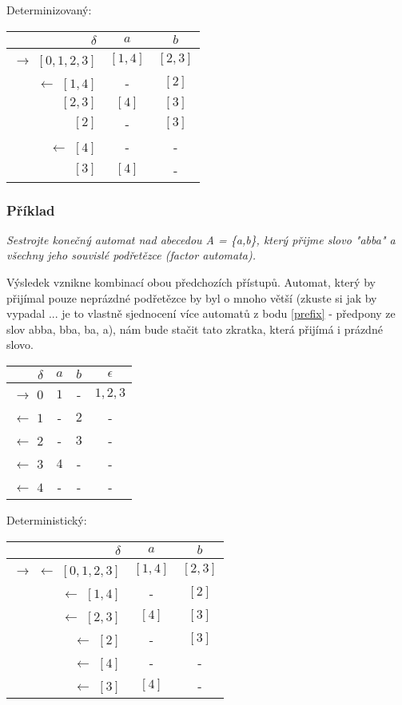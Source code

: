 \documentclass{article}
\begin{document}
Determinizovaný:

\begin{tabular}{|r||c|c|}
\hline
 $\delta$ &      $a$ &   $b$\\
\hline
\hline
$\rightarrow$ $[0,1,2,3]$ &     $[1,4]$ &       $[2,3]$\\
$\leftarrow$ $[1,4]$ &  - &     $[2]$\\
$[2,3]$ &       $[4]$ & $[3]$\\
$[2]$ & - &     $[3]$\\
$\leftarrow$ $[4]$ &    - &     -\\
$[3]$ & $[4]$ & -\\
\hline
\end{tabular}

\subsubsection{Příklad}
\emph{
Sestrojte konečný automat nad abecedou A = \{a,b\}, který přijme slovo "abba" a všechny jeho souvislé podřetězce (factor automata).
}

Výsledek vznikne kombinací obou předchozích přístupů. Automat, který by přijímal pouze neprázdné podřetězce by byl o mnoho větší (zkuste si jak by vypadal ... je to vlastně sjednocení více automatů z bodu \ref{prefix} - předpony ze slov abba, bba, ba, a), nám bude stačit tato zkratka, která přijímá i prázdné slovo.

\begin{tabular}{|r||c|c|c|}
\hline
 $\delta$ &      $a$ &   $b$ &   $\epsilon$\\
\hline
\hline
$\rightarrow$ $0$ &     $1$ &   - &     $1,2,3$\\
$\leftarrow$ $1$ &   - &     $2$ &   -\\
$\leftarrow$ $2$ &   - &     $3$ &   -\\
$\leftarrow$ $3$ &   $4$ &   - &     -\\
$\leftarrow$ $4$ &      - &     - &     -\\
\hline
\end{tabular}

Deterministický:

\begin{tabular}{|r||c|c|}
\hline
 $\delta$ &      $a$ &   $b$\\
\hline
\hline
$\rightarrow$ $\leftarrow$ $[0,1,2,3]$ &        $[1,4]$ &       $[2,3]$\\
$\leftarrow$ $[1,4]$ &  - &     $[2]$\\
$\leftarrow$ $[2,3]$ &  $[4]$ & $[3]$\\
$\leftarrow$ $[2]$ &    - &     $[3]$\\
$\leftarrow$ $[4]$ &    - &     -\\
$\leftarrow$ $[3]$ &    $[4]$ & -\\
\hline
\end{tabular}
\end{document}
